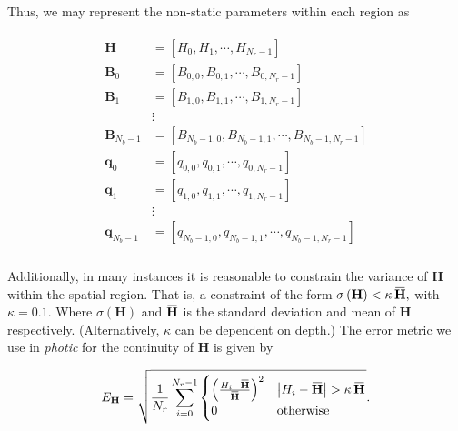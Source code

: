 \documentclass[12pt]{article}
\newcommand{\overbar}[1]{\mkern 1.5mu\overline{\mkern-1.5mu#1\mkern-1.5mu}\mkern 1.5mu}
\numberwithin{equation}{section}
\begin{document}
Thus, we may represent the non-static parameters within each region as  
\begin{linenomath}
\begin{align}
\begin{split}
\textbf{H} &= \left[H_0, H_1, \cdots, H_{N_r-1} \right] \\
\textbf{B}_0 &= \left[B_{0,0}, B_{0,1}, \cdots, B_{0,N_r-1} \right] \\
\textbf{B}_1 &= \left[B_{1,0}, B_{1,1}, \cdots, B_{1,N_r-1} \right] \\
& \vdots \\
\textbf{B}_{N_b-1} &= \left[B_{N_b-1,0}, B_{N_b-1,1}, \cdots, B_{N_b-1,N_r-1} \right] \\
\textbf{q}_0 &= \left[q_{0,0}, q_{0,1}, \cdots, q_{0,N_r-1} \right] \\
\textbf{q}_1 &= \left[q_{1,0}, q_{1,1}, \cdots, q_{1,N_r-1} \right] \\
& \vdots \\
\textbf{q}_{N_b-1} &= \left[q_{N_b-1,0}, q_{N_b-1,1}, \cdots, q_{N_b-1,N_r-1} \right] \\
\end{split}\label{spatial_ext}
\end{align}
\end{linenomath}

Additionally, in many instances it is reasonable to constrain the variance of \textbf{H} 
within the spatial region. That is, a constraint of the form 
$\sigma\left(\textbf{H}\right) < \kappa\, \overbar{\textbf{H}},$ with $\kappa = 0.1$. Where 
$\sigma\left(\textbf{H}\right)$ and $\overbar{\textbf{H}}$ is the standard deviation and mean 
of \textbf{H} respectively. (Alternatively, $\kappa$ can be dependent on depth.) The 
error metric we use in \textit{photic} for the continuity of \textbf{H} is given by 
\begin{linenomath}
\begin{equation}
E_{\textbf{H}} = \sqrt{\frac{1}{N_r}\sum\limits_{i=0}^{N_r-1} 
\begin{cases}
\left(\frac{H_i - \overbar{\textbf{H}}}{\overbar{\textbf{H}}}\right)^2 & \left| H_i - \overbar{\textbf{H}} \right| > \kappa\, \overbar{\textbf{H}}\\
0 & \text{otherwise}
\end{cases}
}.\label{error_H}
\end{equation}
\end{linenomath}
\end{document}
